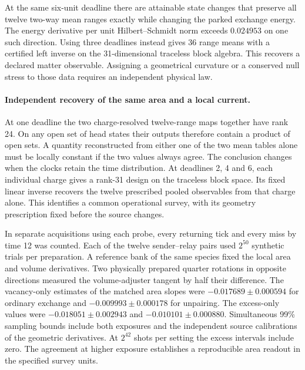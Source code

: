 \documentclass[11pt]{article}
\begin{document}
At the same six-unit deadline there are attainable state changes that
preserve all twelve two-way mean ranges exactly while changing the
parked exchange energy. The energy derivative per unit Hilbert--Schmidt
norm exceeds $0.024953$ on one such direction. Using three deadlines
instead gives 36 range means with a certified left inverse on the
31-dimensional traceless block algebra. This recovers a declared
matter observable. Assigning a geometrical curvature or a conserved
null stress to those data requires an independent physical law.

\paragraph{Independent recovery of the same area and a local current.}
At one deadline the two charge-resolved twelve-range maps together
have rank 24. On any open set of head states their outputs therefore
contain a product of open sets. A quantity reconstructed from either
one of the two mean tables alone must be locally constant if the two
values always agree. The conclusion changes when the clocks retain
the time distribution. At deadlines 2, 4 and 6, each individual charge
gives a rank-31 design on the traceless block space. Its fixed linear
inverse recovers the twelve prescribed pooled observables from that
charge alone. This identifies a common operational survey, with its
geometry prescription fixed before the source changes.

In separate acquisitions using each probe, every returning tick and
every miss by time 12 was counted. Each of the twelve sender--relay
pairs used \(2^{50}\) synthetic trials per preparation. A reference
bank of the same species fixed the local area and volume derivatives.
Two physically prepared quarter rotations in opposite directions
measured the volume-adjuster tangent by half their difference.
The vacancy-only estimates of the matched area slopes were
\(-0.017689\pm0.000594\) for ordinary exchange and
\(-0.009993\pm0.000178\) for unpairing. The excess-only values were
\(-0.018051\pm0.002943\) and \(-0.010101\pm0.000880\).
Simultaneous 99\% sampling bounds include both exposures and the
independent source calibrations of the geometric derivatives.
At \(2^{42}\) shots per setting the excess intervals include zero.
The agreement at higher exposure establishes a reproducible area
readout in the specified survey units.
\end{document}
